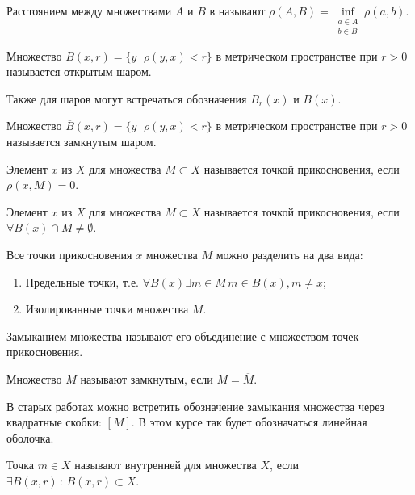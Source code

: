 \begin{Def}
    Расстоянием между множествами $A$ и $B$ в \MS называют $\rho(A, B) = \inf\limits_{\substack{a \in A\\ b \in B}} \rho(a, b)$.
\end{Def}

\begin{Def}
    Множество $B(x, r) = \{ y \, | \, \rho(y, x) < r \}$ в метрическом пространстве при $r > 0$ называется открытым шаром.
\end{Def}
    Также для шаров могут встречаться обозначения $B_r(x)$ и $B(x)$.

\begin{Def}
    Множество $\overline{B}(x, r) = \{ y \, | \, \rho(y, x) < r \}$ в метрическом пространстве при $r > 0$ называется замкнутым шаром.
\end{Def}

\begin{Def}
    Элемент $x$ из \MS $X$ для множества $M \subset X$ называется точкой прикосновения, если $\rho(x, M) = 0$.
\end{Def}

\begin{Def}
    Элемент $x$ из \TS $X$ для множества $M \subset X$ называется точкой прикосновения, если $\forall B(x) \cap M \neq \emptyset$.
\end{Def}

Все точки прикосновения $x$ множества $M$ можно разделить на два вида:
\begin{enumerate}
    \item Предельные точки, т.е. $\forall B(x) \exists m \in M \, m \in B(x), m \neq x$;
    \item Изолированные точки множества $M$.
\end{enumerate}

\begin{Def}
    Замыканием множества называют его объединение с множеством точек прикосновения.
\end{Def}

\begin{Def}
    Множество $M$ называют замкнутым, если $M = \overline{M}$.
\end{Def}

В старых работах можно встретить обозначение замыкания множества через квадратные скобки: $[M]$. В этом курсе так будет обозначаться линейная оболочка.

\begin{Def}
    Точка $m \in X$ называют внутренней для множества $X$, если $\exists B(x, r) \, : \, B(x, r) \subset X$.
\end{Def}

